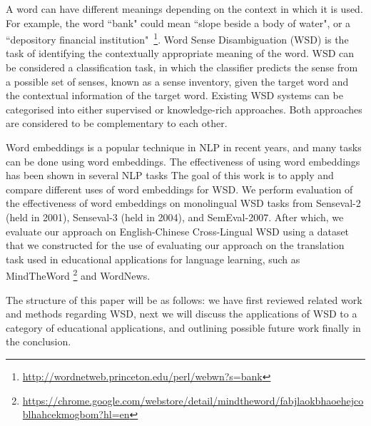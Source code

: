 A word can have different meanings depending on the context in which it is used. For example, the word ``bank" could mean ``slope beside a body of water", or a ``depository financial institution"~\footnote{\url{http://wordnetweb.princeton.edu/perl/webwn?s=bank}}. Word Sense Disambiguation (WSD) is the task of identifying the contextually appropriate meaning of the word. WSD can be considered a classification task, in which the classifier predicts the sense from a possible set of senses, known as a sense inventory, given the target word and the contextual information of the target word. Existing WSD systems can be categorised into either supervised or knowledge-rich approaches. Both approaches are considered to be complementary to each other. 



Word embeddings is a popular technique in NLP in recent years, and many tasks can be done using 
word embeddings. The effectiveness of
using word embeddings has been shown in 
several NLP tasks \cite{Turian10wordrepresentations}
The goal of this work is to apply and compare different uses of word embeddings for WSD. We perform evaluation of the effectiveness of word embeddings on monolingual WSD tasks from Senseval-2 (held in 2001), Senseval-3 (held in 2004), and SemEval-2007. After which, we evaluate our approach on 
English-Chinese Cross-Lingual WSD using a dataset that we constructed for the use of evaluating our approach on the translation task used in educational applications for language learning, such as MindTheWord {\footnote{\url{https://chrome.google.com/webstore/detail/mindtheword/fabjlaokbhaoehejcoblhahcekmogbom?hl=en}}} and WordNews.







The structure of this paper will be as follows: we have first reviewed related work and methods regarding WSD, next we will discuss the applications of WSD to a category of educational applications, and outlining possible future work finally in the conclusion. 







